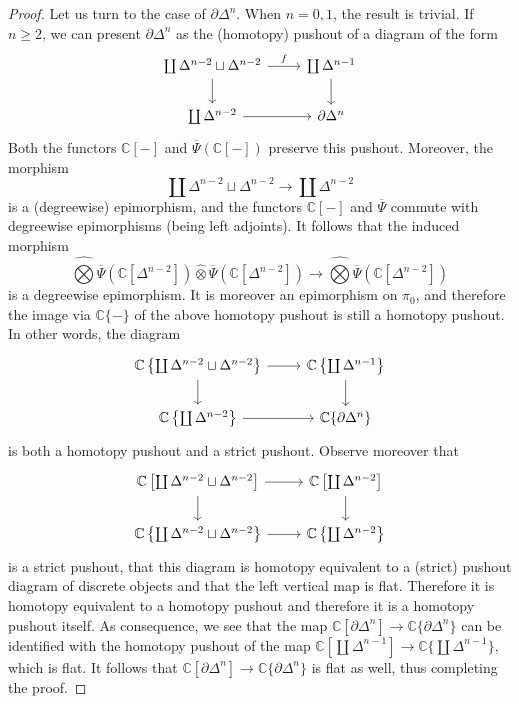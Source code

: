 \documentclass[12pt,a4paper,reqno]{amsart}
\theoremstyle{plain}
\theoremstyle{definition}
\theoremstyle{remark}
\numberwithin{equation}{section}
\begin{document}
\begin{proof}
	Let us turn to the case of $\partial \Delta^n$.
	When $n = 0, 1$, the result is trivial.
	If $n \ge 2$, we can present $\partial \Delta^n$ as the (homotopy) pushout of a diagram of the form
	\[ \begin{tikzcd}
		\coprod \Delta^{n-2} \sqcup \Delta^{n-2} \arrow{r}{f} \arrow{d} & \coprod \Delta^{n-1} \arrow{d} \\
		\coprod \Delta^{n-2} \arrow{r} & \partial \Delta^n
	\end{tikzcd} \]
	Both the functors $\mathbb C[-]$ and $\overline{\Psi}(\mathbb C[-])$ preserve this pushout.
	Moreover, the morphism
	\[ \coprod \Delta^{n-2} \sqcup \Delta^{n-2} \to \coprod \Delta^{n-2} \]
	is a (degreewise) epimorphism, and the functors $\mathbb C[-]$ and $\overline{\Psi}$ commute with degreewise epimorphisms (being left adjoints).
	It follows that the induced morphism
	\[ \widehat{\bigotimes} \overline{\Psi}(\mathbb C[\Delta^{n-2}]) {\widehat{\otimes}} \overline{\Psi}(\mathbb C[\Delta^{n-2}]) \to \widehat{\bigotimes} \overline{\Psi}(\mathbb C[\Delta^{n-2}]) \]
	is a degreewise epimorphism.
	It is moreover an epimorphism on $\pi_0$, and therefore the image via $\mathbb C\{-\}$ of the above homotopy pushout is still a homotopy pushout.
	In other words, the diagram
	\[ \begin{tikzcd}
		\mathbb C \left\{ \coprod \Delta^{n-2} \sqcup \Delta^{n-2} \right\} \arrow{r} \arrow{d} & \mathbb C \left\{ \coprod \Delta^{n-1} \right\} \arrow{d} \\
		\mathbb C \left\{ \coprod \Delta^{n-2} \right\} \arrow{r} & \mathbb C\{\partial \Delta^n\}
	\end{tikzcd} \]
	is both a homotopy pushout and a strict pushout.
	{\ignorespaces}
	Observe moreover that
	\[ \begin{tikzcd}
		\mathbb C \left[ \coprod \Delta^{n-2} \sqcup \Delta^{n-2} \right] \arrow{r} \arrow{d} & \mathbb C \left[ \coprod \Delta^{n-2} \right] \arrow{d} \\
		\mathbb C \left\{ \coprod \Delta^{n-2} \sqcup \Delta^{n-2} \right\} \arrow{r} & \mathbb C \left\{ \coprod \Delta^{n-2} \right\}
	\end{tikzcd} \]
	is a strict pushout, that this diagram is homotopy equivalent to a (strict) pushout diagram of discrete objects and that the left vertical map is flat.
	Therefore it is homotopy equivalent to a homotopy pushout and therefore it is a homotopy pushout itself.
	{\ignorespaces}
	As consequence, we see that the map $\mathbb C[\partial \Delta^n] \to \mathbb C\{\partial \Delta^n\}$ can be identified with the homotopy pushout of the map $\mathbb C [\coprod \Delta^{n-1}] \to \mathbb C\{\coprod \Delta^{n-1}\}$, which is flat.
	It follows that $\mathbb C[\partial \Delta^n] \to \mathbb C\{\partial \Delta^n\}$ is flat as well, thus completing the proof.
\end{proof}
	
\end{document}
